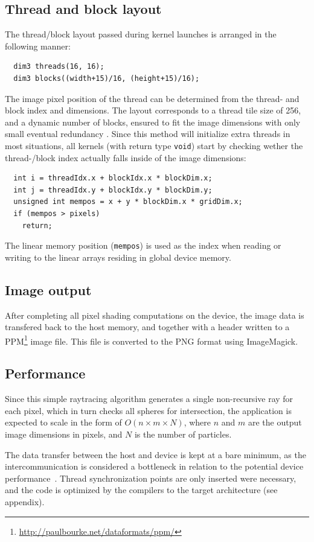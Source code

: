 \documentclass[journal]{IEEEtran}
\begin{document}
\subsection{Thread and block layout}
The thread/block layout passed during kernel launches is arranged in the following manner:
\begin{lstlisting}
  dim3 threads(16, 16);
  dim3 blocks((width+15)/16, (height+15)/16);
\end{lstlisting}
The image pixel position of the thread can be determined from the thread- and block index and dimensions. The layout corresponds to a thread tile size of 256, and a dynamic number of blocks, ensured to fit the image dimensions with only small eventual redundancy \cite{Sanders:2010}. Since this method will initialize extra threads in most situations, all kernels (with return type \texttt{void}) start by checking wether the thread-/block index actually falls inside of the image dimensions:
\begin{lstlisting}
  int i = threadIdx.x + blockIdx.x * blockDim.x;
  int j = threadIdx.y + blockIdx.y * blockDim.y;
  unsigned int mempos = x + y * blockDim.x * gridDim.x;
  if (mempos > pixels)
    return;
\end{lstlisting}
The linear memory position (\texttt{mempos}) is used as the index when reading or writing to the linear arrays residing in global device memory.

\subsection{Image output}
After completing all pixel shading computations on the device, the image data is transfered back to the host memory, and together with a header written to a PPM\footnote{\url{http://paulbourke.net/dataformats/ppm/}} image file. This file is converted to the PNG format using ImageMagick.

\subsection{Performance}
Since this simple raytracing algorithm generates a single non-recursive ray for each pixel, which in turn checks all spheres for intersection, the application is expected to scale in the form of $O(n\times m \times N)$, where $n$ and $m$ are the output image dimensions in pixels, and $N$ is the number of particles.

The data transfer between the host and device is kept at a bare minimum, as the intercommunication is considered a bottleneck in relation to the potential device performance \cite{Nvidia-2:2010}. Thread synchronization points are only inserted were necessary, and the code is optimized by the compilers to the target architecture (see appendix). 
\end{document}
